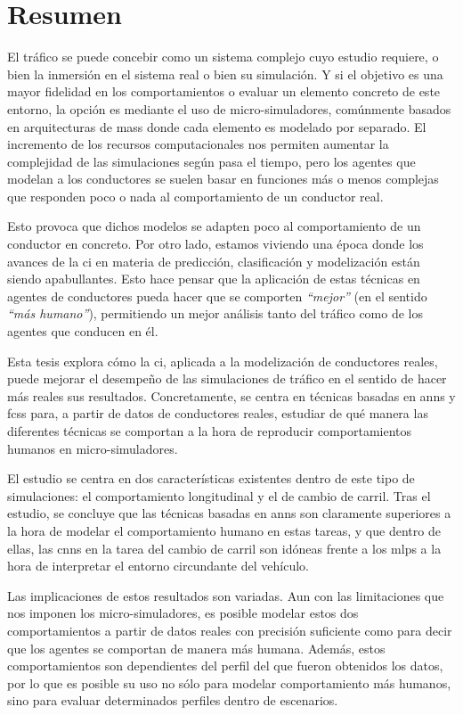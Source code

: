 \cleardoublepage
\thispagestyle{empty}
\chapter*{Resumen}
\begin{fullwidth}
	El tráfico se puede concebir como un sistema complejo cuyo estudio requiere, o bien la inmersión en el sistema real o bien su simulación. Y si el objetivo es una mayor fidelidad en los comportamientos o evaluar un elemento concreto de este entorno, la opción es mediante el uso de micro-simuladores, comúnmente basados en arquitecturas de \acp{mas} donde cada elemento es modelado por separado. El incremento de los recursos computacionales nos permiten aumentar la complejidad de las simulaciones según pasa el tiempo, pero los agentes que modelan a los conductores se suelen basar en funciones más o menos complejas que responden poco o nada al comportamiento de un conductor real.
	
	Esto provoca que dichos modelos se adapten poco al comportamiento de un conductor en concreto. Por otro lado, estamos viviendo una época donde los avances de la \ac{ci} en materia de predicción, clasificación y modelización están siendo apabullantes. Esto hace pensar que la aplicación de estas técnicas en agentes de conductores pueda hacer que se comporten \textit{\enquote{mejor}} (en el sentido \textit{\enquote{más humano}}), permitiendo un mejor análisis tanto del tráfico como de los agentes que conducen en él.
	
	Esta tesis explora cómo la \ac{ci}, aplicada a la modelización de conductores reales, puede mejorar el desempeño de las simulaciones de tráfico en el sentido de hacer más reales sus resultados. Concretamente, se centra en técnicas basadas en \acp{ann} y \acp{fcs} para, a partir de datos de conductores reales, estudiar de qué manera las diferentes técnicas se comportan a la hora de reproducir comportamientos humanos en micro-simuladores.
	
	El estudio se centra en dos características existentes dentro de este tipo de simulaciones: el comportamiento longitudinal y el de cambio de carril. Tras el estudio, se concluye que las técnicas basadas en \acp{ann} son claramente superiores a la hora de modelar el comportamiento humano en estas tareas, y que dentro de ellas, las \acp{cnn} en la tarea del cambio de carril son idóneas frente a los \acp{mlp} a la hora de interpretar el entorno circundante del vehículo.
	
	Las implicaciones de estos resultados son variadas. Aun con las limitaciones que nos imponen los micro-simuladores, es posible modelar estos dos comportamientos a partir de datos reales con precisión suficiente como para decir que los agentes se comportan de manera más humana. Además, estos comportamientos son dependientes del perfil del que fueron obtenidos los datos, por lo que es posible su uso no sólo para modelar comportamiento más humanos, sino para evaluar determinados perfiles dentro de escenarios.
	

\end{fullwidth}

